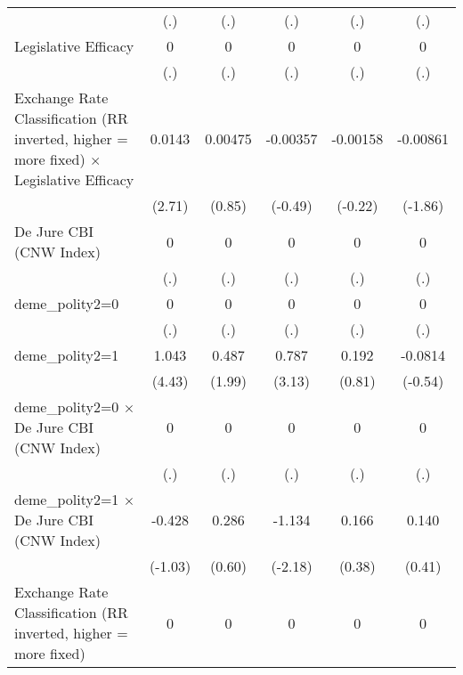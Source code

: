 {\begin{tabular*}{\linewidth}{@{\hskip\tabcolsep\extracolsep\fill}l*{5}{c}}
                &      (.)         &      (.)         &      (.)         &      (.)         &      (.)         \\
\addlinespace
Legislative Efficacy&        0         &        0         &        0         &        0         &        0         \\
                &      (.)         &      (.)         &      (.)         &      (.)         &      (.)         \\
\addlinespace
Exchange Rate Classification (RR inverted, higher = more fixed) $\times$ Legislative Efficacy&   0.0143\sym{**} &  0.00475         & -0.00357         & -0.00158         & -0.00861         \\
                &   (2.71)         &   (0.85)         &  (-0.49)         &  (-0.22)         &  (-1.86)         \\
\addlinespace
De Jure CBI (CNW Index)&        0         &        0         &        0         &        0         &        0         \\
                &      (.)         &      (.)         &      (.)         &      (.)         &      (.)         \\
\addlinespace
deme\_polity2=0  &        0         &        0         &        0         &        0         &        0         \\
                &      (.)         &      (.)         &      (.)         &      (.)         &      (.)         \\
\addlinespace
deme\_polity2=1  &    1.043\sym{***}&    0.487\sym{*}  &    0.787\sym{**} &    0.192         &  -0.0814         \\
                &   (4.43)         &   (1.99)         &   (3.13)         &   (0.81)         &  (-0.54)         \\
\addlinespace
deme\_polity2=0 $\times$ De Jure CBI (CNW Index)&        0         &        0         &        0         &        0         &        0         \\
                &      (.)         &      (.)         &      (.)         &      (.)         &      (.)         \\
\addlinespace
deme\_polity2=1 $\times$ De Jure CBI (CNW Index)&   -0.428         &    0.286         &   -1.134\sym{*}  &    0.166         &    0.140         \\
                &  (-1.03)         &   (0.60)         &  (-2.18)         &   (0.38)         &   (0.41)         \\
\addlinespace
Exchange Rate Classification (RR inverted, higher = more fixed)&        0         &        0         &        0         &        0         &        0         \\

\end{tabular*}}
